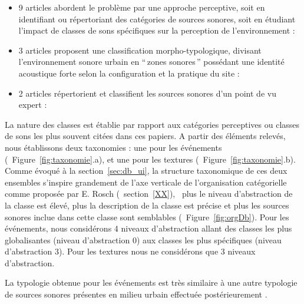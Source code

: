\begin{itemize}
\item 9 articles abordent le problème par une approche perceptive, soit en identifiant ou répertoriant des catégories de sources sonores, soit en étudiant l'impact de classes de sons spécifiques sur la perception de l'environnement : \cite{maffiolo_caracterisation_1999,raimbault2002simulation,guastavino_etude_2003,defreville2004aactivity,raimbault2005urban,dubois2006cognitive,devergie_relations_2006,guastavino2006ideal,niessen2010categories}
\item 3 articles proposent une classification morpho-typologique, divisant l’environnement sonore urbain en ``\,zones sonores\,'' possédant une identité acoustique forte selon la configuration et la pratique du site : \cite{maffiolo_caracterisation_1999,beaumont2004pertinence,polack2008perceptive}
\item 2 articles répertorient et classifient les sources sonores d’un point de vu expert : \cite{leobon_analyse_1986,brown2011towards}
\end{itemize}

La nature des classes est établie par rapport aux catégories perceptives ou classes de sons les plus souvent citées dans ces papiers. A  partir des éléments relevés, nous établissons deux taxonomies : une pour les événements (\cf~Figure~\ref{fig:taxonomie}.a), et une pour les textures (\cf~Figure~\ref{fig:taxonomie}.b). Comme évoqué à la section~\ref{sec:db_ui}, la structure taxonomique de ces deux ensembles s'inspire grandement de l'axe verticale de l'organisation catégorielle comme proposée par E. Rosch (\Cf~section~\ref{XX}), \ie~plus le niveau d'abstraction de la classe est élevé, plus la description de la classe est précise et plus les sources sonores inclue dans cette classe sont semblables (\Cf~Figure~\ref{fig:orgDb}). Pour les événements, nous considérons 4 niveaux d'abstraction allant des classes les plus globalisantes (niveau d'abstraction 0) aux classes les plus spécifiques (niveau d'abstraction 3). Pour les textures nous ne considérons que 3 niveaux d'abstraction.

La typologie obtenue pour les événements est très similaire à une autre typologie de sources sonores présentes en milieu urbain effectuée postérieurement \citep{Salamon14}. \\


